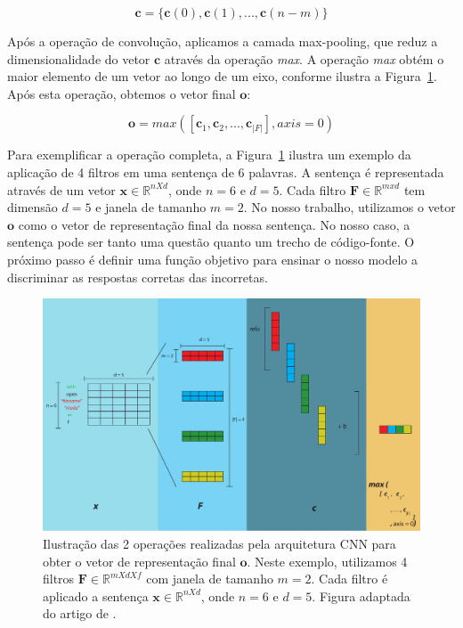 \begin{equation}
    \bm{c} = \{ \bm{c}(0), \bm{c}(1), . . ., \bm{c}(n - m) \} 
\end{equation}




Após a operação de convolução, aplicamos a camada \gls{max-pooling}, que reduz a dimensionalidade do vetor $\bm{c}$ através da operação \textit{max}. A operação \textit{max} obtém o maior elemento de um vetor ao longo de um eixo, conforme ilustra a Figura~\ref{fig:cnn-architecture-proposal}. Após esta operação, obtemos o vetor final $\bm{o}$:

\begin{equation}
    \bm{o} = max\left(\left[\bm{c}_{1}, \bm{c}_{2}, . . ., \bm{c}_{|F|}\right], axis = 0\right)
\end{equation}

Para exemplificar a operação completa, a Figura~\ref{fig:cnn-architecture-proposal} ilustra um exemplo da aplicação de 4 filtros em uma sentença de 6 palavras. A sentença é representada através de um vetor $\bm{x} \in \mathbb{R}^{n X d}$, onde $n = 6$ e $d = 5$. Cada filtro $\bm{F} \in \mathbb{R}^{m x d}$ tem dimensão $d = 5$ e janela de tamanho $m = 2$. No nosso trabalho, utilizamos o vetor $\bm{o}$ como o vetor de representação final da nossa sentença. No nosso caso, a sentença pode ser tanto uma questão quanto um trecho de código-fonte. O próximo passo é definir uma função objetivo para ensinar o nosso modelo a discriminar as respostas corretas das incorretas.

\begin{figure}[h]
    \centering
    \includegraphics[width=1\textwidth]{figuras/cap-problema/cnn-steps-word-embedding-article.pdf}
    \caption{Ilustração das 2 operações realizadas pela arquitetura CNN para obter o vetor de representação final $\bm{o}$. Neste exemplo, utilizamos 4 filtros $\bm{F} \in \mathbb{R}^{m X d X f}$ com janela de tamanho $m = 2$. Cada filtro é aplicado a sentença $\bm{x} \in \mathbb{R}^{n X d}$, onde $n = 6$ e $d = 5$. Figura adaptada do artigo de \cite{zhang-guide-convolutional-cnn-embedding-ilustration:2015}.}
    \label{fig:cnn-architecture-proposal}
\end{figure}




